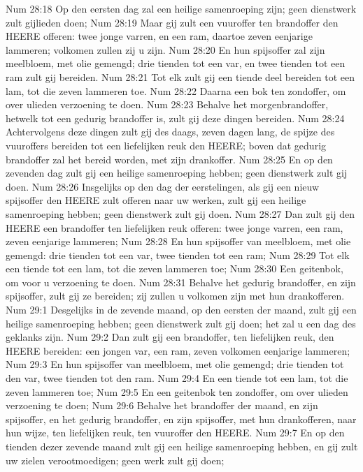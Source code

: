Num 28:18  Op den eersten dag zal een heilige samenroeping zijn; geen dienstwerk zult gijlieden doen;
Num 28:19  Maar gij zult een vuuroffer ten brandoffer den HEERE offeren: twee jonge varren, en een ram, daartoe zeven eenjarige lammeren; volkomen zullen zij u zijn.
Num 28:20  En hun spijsoffer zal zijn meelbloem, met olie gemengd; drie tienden tot een var, en twee tienden tot een ram zult gij bereiden.
Num 28:21  Tot elk zult gij een tiende deel bereiden tot een lam, tot die zeven lammeren toe.
Num 28:22  Daarna een bok ten zondoffer, om over ulieden verzoening te doen.
Num 28:23  Behalve het morgenbrandoffer, hetwelk tot een gedurig brandoffer is, zult gij deze dingen bereiden.
Num 28:24  Achtervolgens deze dingen zult gij des daags, zeven dagen lang, de spijze des vuuroffers bereiden tot een liefelijken reuk den HEERE; boven dat gedurig brandoffer zal het bereid worden, met zijn drankoffer.
Num 28:25  En op den zevenden dag zult gij een heilige samenroeping hebben; geen dienstwerk zult gij doen.
Num 28:26  Insgelijks op den dag der eerstelingen, als gij een nieuw spijsoffer den HEERE zult offeren naar uw werken, zult gij een heilige samenroeping hebben; geen dienstwerk zult gij doen.
Num 28:27  Dan zult gij den HEERE een brandoffer ten liefelijken reuk offeren: twee jonge varren, een ram, zeven eenjarige lammeren;
Num 28:28  En hun spijsoffer van meelbloem, met olie gemengd: drie tienden tot een var, twee tienden tot een ram;
Num 28:29  Tot elk een tiende tot een lam, tot die zeven lammeren toe;
Num 28:30  Een geitenbok, om voor u verzoening te doen.
Num 28:31  Behalve het gedurig brandoffer, en zijn spijsoffer, zult gij ze bereiden; zij zullen u volkomen zijn met hun drankofferen.
Num 29:1  Desgelijks in de zevende maand, op den eersten der maand, zult gij een heilige samenroeping hebben; geen dienstwerk zult gij doen; het zal u een dag des geklanks zijn.
Num 29:2  Dan zult gij een brandoffer, ten liefelijken reuk, den HEERE bereiden: een jongen var, een ram, zeven volkomen eenjarige lammeren;
Num 29:3  En hun spijsoffer van meelbloem, met olie gemengd; drie tienden tot den var, twee tienden tot den ram.
Num 29:4  En een tiende tot een lam, tot die zeven lammeren toe;
Num 29:5  En een geitenbok ten zondoffer, om over ulieden verzoening te doen;
Num 29:6  Behalve het brandoffer der maand, en zijn spijsoffer, en het gedurig brandoffer, en zijn spijsoffer, met hun drankofferen, naar hun wijze, ten liefelijken reuk, ten vuuroffer den HEERE.
Num 29:7  En op den tienden dezer zevende maand zult gij een heilige samenroeping hebben, en gij zult uw zielen verootmoedigen; geen werk zult gij doen;

